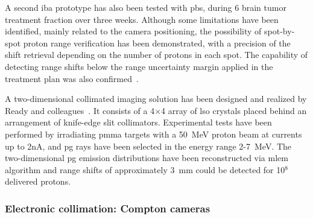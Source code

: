 A second \gls{iba} prototype has also been tested with \gls{pbs}, during 6 brain tumor treatment fraction over three weeks. Although some limitations have been identified, mainly related to the camera positioning, the possibility of spot-by-spot proton range verification has been demonstrated, with a precision of the shift retrieval depending on the number of protons in each spot. The capability of detecting range shifts below the range uncertainty margin applied in the treatment plan was also confirmed~\parencite{Xie2017}.

A two-dimensional collimated imaging solution has been designed and realized by Ready and colleagues~\parencite{Ready2016PHD, Ready2016}. It consists of a 4$\times$4 array of \gls{lso} crystals placed behind an arrangement of knife-edge slit collimators. Experimental tests have been performed by irradiating \gls{pmma} targets with a 50~MeV proton beam at currents up to 2nA, and \gls{pg} rays have been selected in the energy range 2-7~MeV. The two-dimensional \gls{pg} emission distributions have been reconstructed via \gls{mlem} algorithm and range shifts of approximately 3~mm could be detected for 10$^8$ delivered protons.   

\subsubsection{Electronic collimation: Compton cameras}\label{chap2::subsubsec::PGI_elecColl}

